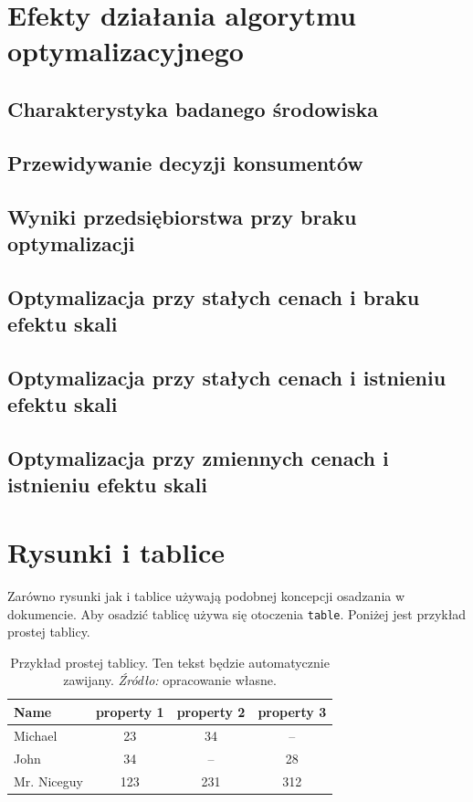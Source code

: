 \documentclass[polish, twoside, 12pt, a4paper]{article}
\theoremstyle{definition}
\theoremstyle{plain}
\theoremstyle{remark}
\begin{document}
\clearpage
\section{Efekty działania algorytmu optymalizacyjnego}
\subsection{Charakterystyka badanego środowiska}
\subsection{Przewidywanie decyzji konsumentów}
\subsection{Wyniki przedsiębiorstwa przy braku optymalizacji}
\subsection{Optymalizacja przy stałych cenach i braku efektu skali}
\subsection{Optymalizacja przy stałych cenach i istnieniu efektu skali}
\subsection{Optymalizacja przy zmiennych cenach i istnieniu efektu skali}



\clearpage
\section{Rysunki i tablice}

Zarówno rysunki jak i tablice używają podobnej koncepcji osadzania w dokumencie. Aby osadzić tablicę używa się otoczenia  \verb+table+. Poniżej jest przykład prostej tablicy.

\begin{table}[hbt]
  \centering

  \captionsetup{margin=10pt,font=small,labelfont=bf,width=.8\textwidth}

  \caption[Przykład prostej tablicy]{Przykład prostej tablicy. Ten tekst będzie automatycznie zawijany. \textit{Źródło:} opracowanie własne.}
  \label{tab:exceptional-table}

\vspace*{2ex}

  \begin{tabular}{lccc}
    Name        & property 1 & property 2 & property 3 \\ \hline
    Michael     & 23         & 34         & --         \\
    John        & 34         & --         & 28         \\
    Mr. Niceguy & 123        & 231        & 312        \\ \hline
  \end{tabular}
\end{table}
\end{document}
